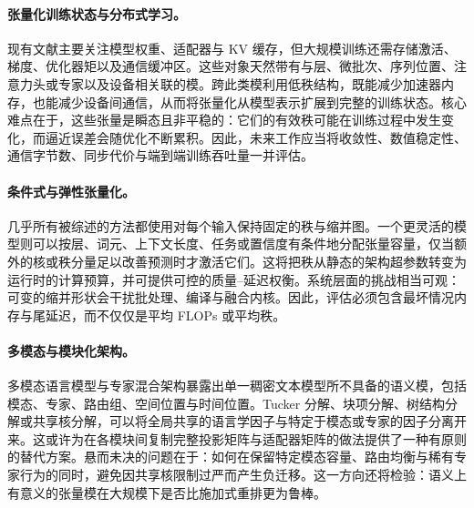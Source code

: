 \paragraph{张量化训练状态与分布式学习。}
现有文献主要关注模型权重、适配器与 KV 缓存，但大规模训练还需存储激活、梯度、优化器矩以及通信缓冲区。这些对象天然带有与层、微批次、序列位置、注意力头或专家以及设备相关联的模。跨此类模利用低秩结构，既能减少加速器内存，也能减少设备间通信，从而将张量化从模型表示扩展到完整的训练状态。核心难点在于，这些张量是瞬态且非平稳的：它们的有效秩可能在训练过程中发生变化，而逼近误差会随优化不断累积。因此，未来工作应当将收敛性、数值稳定性、通信字节数、同步代价与端到端训练吞吐量一并评估。

\paragraph{条件式与弹性张量化。}
几乎所有被综述的方法都使用对每个输入保持固定的秩与缩并图。一个更灵活的模型则可以按层、词元、上下文长度、任务或置信度有条件地分配张量容量，仅当额外的核或秩分量足以改善预测时才激活它们。这将把秩从静态的架构超参数转变为运行时的计算预算，并可提供可控的质量--延迟权衡。系统层面的挑战相当可观：可变的缩并形状会干扰批处理、编译与融合内核。因此，评估必须包含最坏情况内存与尾延迟，而不仅仅是平均 FLOPs 或平均秩。

\paragraph{多模态与模块化架构。}
多模态语言模型与专家混合架构暴露出单一稠密文本模型所不具备的语义模，包括模态、专家、路由组、空间位置与时间位置。Tucker 分解、块项分解、树结构分解或共享核分解，可以将全局共享的语言学因子与特定于模态或专家的因子分离开来。这或许为在各模块间复制完整投影矩阵与适配器矩阵的做法提供了一种有原则的替代方案。悬而未决的问题在于：如何在保留特定模态容量、路由均衡与稀有专家行为的同时，避免因共享核限制过严而产生负迁移。这一方向还将检验：语义上有意义的张量模在大规模下是否比施加式重排更为鲁棒。



